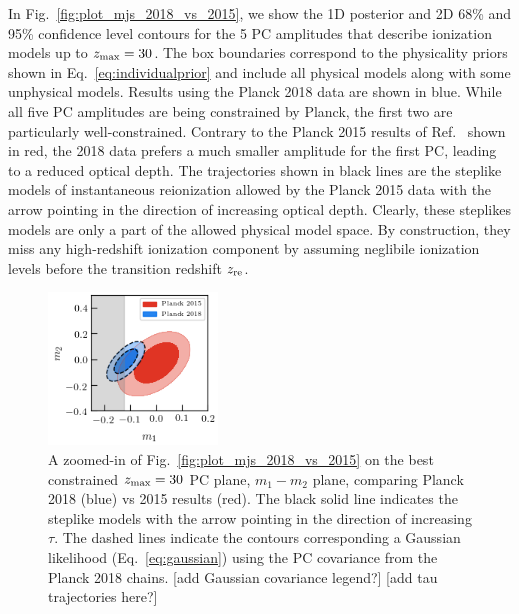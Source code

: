 \documentclass[prd,twocolumn,amsmath,amssymb,floatfix,superscriptaddress,nofootinbib]{revtex4-1}
\newcommand{\zmax}{z_{\rm max}}
\begin{document}
In Fig.~\ref{fig:plot_mjs_2018_vs_2015}, we show the 1D posterior and 2D 68\% and 95\% confidence level contours for the 5 PC amplitudes that describe ionization models up to $\zmax=30$. The box boundaries correspond to the physicality priors shown in Eq.~\ref{eq:individualprior} and include all physical models along with some unphysical models. Results using the Planck 2018 data are shown in blue. While all five PC amplitudes are being constrained by Planck, the first two are particularly well-constrained. Contrary to the Planck 2015 results of Ref.~\cite{Heinrich:2016ojb} shown in red, the 2018 data prefers a much smaller amplitude for the first PC, leading to a reduced optical depth.
The trajectories shown in black lines are the steplike models of instantaneous reionization allowed by the Planck 2015 data with the arrow pointing in the direction of increasing optical depth. Clearly, these steplikes models are only a part of the allowed physical model space. By construction, they miss any high-redshift ionization component by assuming neglibile ionization levels before the transition redshift $z_{\rm re}$. 
\begin{figure}
\includegraphics[width=0.4\textwidth]{plots/plot_m1_m2_t18_r12_t19_t20_vs_pl18_pc_zmax30_pliklite_srollv2_1015_wGaussEllipse.png}
\caption{A zoomed-in of Fig.~\ref{fig:plot_mjs_2018_vs_2015} on the best constrained $\zmax=30$ PC plane, $m_1-m_2$ plane, comparing Planck 2018 (blue) vs 2015 results (red). The black solid line indicates the steplike models with the arrow pointing in the direction of increasing $\tau$. The dashed lines indicate the contours corresponding a Gaussian likelihood (Eq.~\ref{eq:gaussian}) using the PC covariance from the Planck 2018 chains. [add Gaussian covariance legend?] [add tau trajectories here?]
}
\label{fig:plot_m1m2_2015_vs_2018}
\end{figure}
\end{document}
